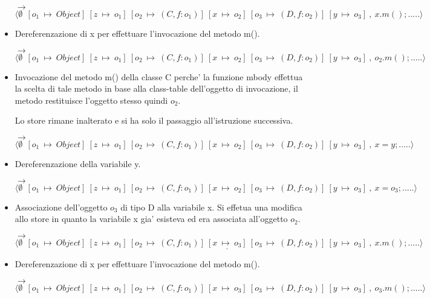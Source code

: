 \begin{itemize}
$\rightarrow$ $\langle\emptyset\:\:[o_1\:\mapsto\:Object]\:[z\:\mapsto\:o_1]\:[o_2\:\mapsto\:(C,f:o_1)]\:[x\:\mapsto\:o_2]\:[o_3\:\mapsto\:(D,f:o_2)]\:[y\:\mapsto\:o_3]\:,\:x.m();.....\rangle$

\vspace{0,5cm}
\item Dereferenzazione di x per effettuare l'invocazione del metodo m().

$\rightarrow$ $\langle\emptyset\:\:[o_1\:\mapsto\:Object]\:[z\:\mapsto\:o_1]\:[o_2\:\mapsto\:(C,f:o_1)]\:[x\:\mapsto\:o_2]\:[o_3\:\mapsto\:(D,f:o_2)]\:[y\:\mapsto\:o_3]\:,\:o_2.m();.....\rangle$

\vspace{0,5cm}
\item Invocazione del metodo m() della classe C perche' la funzione mbody effettua la scelta di tale metodo in base alla class-table dell'oggetto di invocazione, il metodo restituisce l'oggetto stesso quindi $o_2$.

Lo store rimane inalterato e si ha solo il passaggio all'istruzione successiva.

$\rightarrow$ $\langle\emptyset\:\:[o_1\:\mapsto\:Object]\:[z\:\mapsto\:o_1]\:[o_2\:\mapsto\:(C,f:o_1)]\:[x\:\mapsto\:o_2]\:[o_3\:\mapsto\:(D,f:o_2)]\:[y\:\mapsto\:o_3]\:,\:x=y;.....\rangle$

\vspace{0,5cm}
\item Dereferenzazione della variabile y.

$\rightarrow$ $\langle\emptyset\:\:[o_1\:\mapsto\:Object]\:[z\:\mapsto\:o_1]\:[o_2\:\mapsto\:(C,f:o_1)]\:[x\:\mapsto\:o_2]\:[o_3\:\mapsto\:(D,f:o_2)]\:[y\:\mapsto\:o_3]\:,\:x=o_3;.....\rangle$

\vspace{0,5cm}
\item Associazione dell'oggetto $o_3$ di tipo D alla variabile x. Si effetua una modifica allo store in quanto la variabile x gia' esisteva ed era associata all'oggetto $o_2$.

$\rightarrow$ $\langle\emptyset\:\:[o_1\:\mapsto\:Object]\:[z\:\mapsto\:o_1]\:[o_2\:\mapsto\:(C,f:o_1)]\:\underline{[x\:\mapsto\:o_3]}\:[o_3\:\mapsto\:(D,f:o_2)]\:[y\:\mapsto\:o_3]\:,\:x.m();.....\rangle$

\vspace{0,5cm}
\item Dereferenzazione di x per effettuare l'invocazione del metodo m().

$\rightarrow$ $\langle\emptyset\:\:[o_1\:\mapsto\:Object]\:[z\:\mapsto\:o_1]\:[o_2\:\mapsto\:(C,f:o_1)]\:[x\:\mapsto\:o_3]\:[o_3\:\mapsto\:(D,f:o_2)]\:[y\:\mapsto\:o_3]\:,\:o_3.m();.....\rangle$


\end{itemize}
